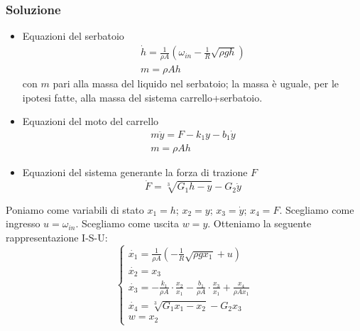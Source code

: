 \documentclass[a4paper]{report}
\begin{document}
\subsubsection{Soluzione}
\begin{itemize}
\item Equazioni del serbatoio
  \[
    \begin{array}{l}
      \dot{h} = \frac{1}{\rho A} \left( \omega_{in} -
      \frac{1}{R}\sqrt{\rho g h} \right)\\
      m = \rho A h
    \end{array}
    \]
  con $m$ pari alla massa del liquido
  nel serbatoio; la massa \`e uguale, per le ipotesi fatte, alla massa
  del sistema carrello+serbatoio.
\item Equazioni del moto del carrello
  \[
    \begin{array}{l}
      m \ddot{y} = F - k_1 y - b_1 \dot{y}\\
      m = \rho A h
    \end{array}
    \]
\item Equazioni del sistema generante la forza di trazione $F$
  \[
    \dot{F} = \sqrt[3]{G_1 h - y} -
    G_2 \dot{y}
  \]
\end{itemize}
Poniamo come variabili di stato $x_1 = h$; $x_2 = y$; $x_3 = \dot{y}$;
$x_4 = F$. Scegliamo come ingresso $u = \omega_{in}$. Scegliamo come
uscita $w = y$. Otteniamo la seguente rappresentazione I-S-U:
{\Large\[
  \left\{
  \begin{array}{l}
    \dot{x_1} = \frac{1}{\rho A} \left( -\frac{1}{R} \sqrt{\rho g x_1}
    + u\right)\\
    \dot{x_2} = x_3\\
    \dot{x_3} = - \frac{k_1}{\rho A} \cdot \frac{x_2}{x_1} -
    \frac{b_1}{\rho A} \cdot \frac{x_3}{x_1} + \frac{x_4}{\rho A
      x_1}\\
    \dot{x_4} = \sqrt[3]{G_1 x_1 - x_2} - G_2 x_3\\
    w = x_2
  \end{array}
  \right .
\]
}
\end{document}
